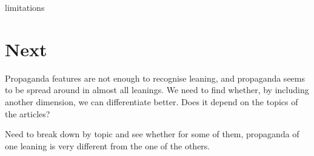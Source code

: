 limitations

\section{Next}
\label{sec:ps_next}

Propaganda features are not enough to recognise leaning, and propaganda seems to be spread around in almost all leanings. We need to find whether, by including another dimension, we can differentiate better. 
Does it depend on the topics of the articles?

Need to break down by topic and see whether for some of them, propaganda of one leaning is very different from the one of the others.